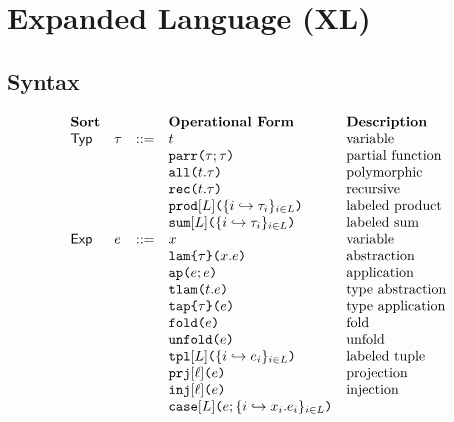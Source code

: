 \clearpage

\section{Expanded Language (XL)}\label{appendix:SES-XL}
\subsection{Syntax}
\[\begin{array}{lllllll}
\textbf{Sort} & & 
& \textbf{Operational Form} 
& \textbf{Description}\\
\mathsf{Typ} & \tau & ::= & t 
& \text{variable}\\
&&& \texttt{parr}\texttt{(}\tau; \tau\texttt{)} 
& \text{partial function}\\
&&& \texttt{all}\texttt{(}t.\tau\texttt{)} 
& \text{polymorphic}\\
&&& \texttt{rec}\texttt{(}t.\tau\texttt{)} 
& \text{recursive}\\
&&& \texttt{prod}[L]\texttt{(}\{i \hookrightarrow \tau_{i}\}_{i \in L}\texttt{)} 
& \text{labeled product}\\
&&& \texttt{sum}[L]\texttt{(}\{i \hookrightarrow \tau_{i}\}_{i \in L}\texttt{)} 
& \text{labeled sum}\\
\mathsf{Exp} & e & ::= & x 
& \text{variable}\\
&&& \texttt{lam}\texttt{\{}\tau\texttt{\}(}x.e\texttt{)} 
& \text{abstraction}\\
&&& \texttt{ap}\texttt{(}e; e\texttt{)} 
& \text{application}\\
&&& \texttt{tlam}\texttt{(}t.e\texttt{)} 
& \text{type abstraction}\\
&&& \texttt{tap}\texttt{\{}\tau\texttt{\}(}e\texttt{)} 
& \text{type application}\\
&&& \texttt{fold}\texttt{(}e\texttt{)} 
& \text{fold}\\
&&& \texttt{unfold}\texttt{(}e\texttt{)} 
& \text{unfold}\\
&&& \texttt{tpl}[L]\texttt{(}\{i \hookrightarrow e_{i}\}_{i \in L}\texttt{)} 
& \text{labeled tuple}\\
&&& \texttt{prj}[\ell]\texttt{(}e\texttt{)} 
& \text{projection}\\
&&& \texttt{inj}[\ell]\texttt{(}e\texttt{)} 
& \text{injection}\\
&&& \texttt{case}[L]\texttt{(}e; \{i \hookrightarrow x_{i}.e_{i}\}_{i \in L}\texttt{)} 

\end{array}\]
